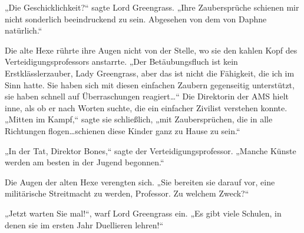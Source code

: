 „Die Geschicklichkeit?“ sagte Lord Greengrass. „Ihre Zaubersprüche schienen mir nicht sonderlich beeindruckend zu sein. Abgesehen von dem von Daphne natürlich.“

Die alte Hexe rührte ihre Augen nicht von der Stelle, wo sie den kahlen Kopf des Verteidigungsprofessors anstarrte. „Der Betäubungsfluch ist kein Erstklässlerzauber, Lady Greengrass, aber das ist nicht die Fähigkeit, die ich im Sinn hatte. Sie haben sich mit diesen einfachen Zaubern gegenseitig unterstützt, sie haben schnell auf Überraschungen reagiert…“ Die Direktorin der AMS hielt inne, als ob er nach Worten suchte, die ein einfacher Zivilist verstehen konnte. „Mitten im Kampf,“ sagte sie schließlich, „mit Zaubersprüchen, die in alle Richtungen flogen…schienen diese Kinder ganz zu Hause zu sein.“

„In der Tat, Direktor Bones,“ sagte der Verteidigungsprofessor. „Manche Künste werden am besten in der Jugend begonnen.“

Die Augen der alten Hexe verengten sich. „Sie bereiten sie darauf vor, eine militärische Streitmacht zu werden, Professor. Zu welchem Zweck?“

„Jetzt warten Sie mal!“, warf Lord Greengrass ein. „Es gibt viele Schulen, in denen sie im ersten Jahr Duellieren lehren!“


